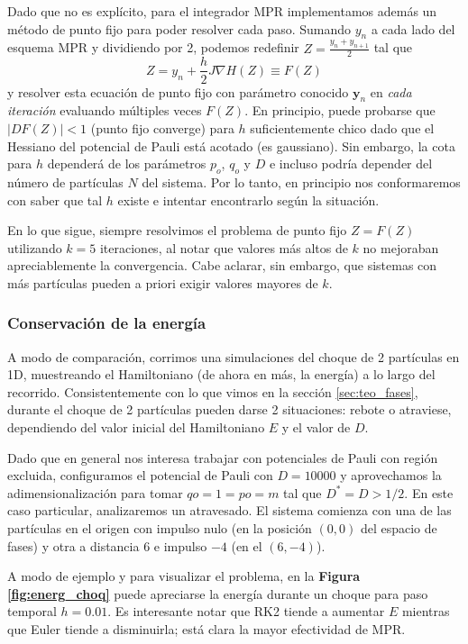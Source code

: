 Dado que no es explícito, para el integrador MPR implementamos además un método de punto fijo para poder resolver cada paso.
Sumando $y_n$ a cada lado del esquema MPR y dividiendo por 2, podemos redefinir $Z = \frac{y_n+y_{n+1}}{2}$ tal que
\[ Z = y_n + \frac{h}{2}J\nabla H(Z) \equiv F(Z) \]
y resolver esta ecuación de punto fijo con parámetro conocido $\mathbf{y}_n$ en \textit{cada iteración} evaluando múltiples veces $F(Z)$.
En principio, puede probarse que $|DF(Z)|<1$ (punto fijo converge) para $h$ suficientemente chico dado que el Hessiano del potencial de Pauli está acotado (es gaussiano).
Sin embargo, la cota para $h$ dependerá de los parámetros $p_o$, $q_o$ y $D$ e incluso podría depender del número de partículas $N$ del sistema.
Por lo tanto, en principio nos conformaremos con saber que tal $h$ existe e intentar encontrarlo según la situación.

En lo que sigue, siempre resolvimos el problema de punto fijo $Z = F(Z)$ utilizando $k=5$ iteraciones, al notar que valores más altos de $k$ no mejoraban apreciablemente la convergencia.
Cabe aclarar, sin embargo, que sistemas con más partículas pueden a priori exigir valores mayores de $k$.

\subsubsection{Conservación de la energía}

A modo de comparación, corrimos una simulaciones del choque de 2 partículas en 1D, muestreando el Hamiltoniano (de ahora en más, la energía) a lo largo del recorrido.
Consistentemente con lo que vimos en la sección \ref{sec:teo_fases}, durante el choque de 2 partículas pueden darse 2 situaciones: rebote o atraviese, dependiendo del valor inicial del Hamiltoniano $E$ y el valor de $D$.

Dado que en general nos interesa trabajar con potenciales de Pauli con región excluida, configuramos el potencial de Pauli con $D = 10000$ y aprovechamos la adimensionalización para tomar $qo = 1 = po = m$ tal que 
$D^*=D>1/2$.
En este caso particular, analizaremos un atravesado.
El sistema comienza con una de las partículas en el origen con impulso nulo (en la posición $(0, 0)$ del espacio de fases) y otra a distancia $6$ e impulso $-4$ (en el $(6, -4)$).

A modo de ejemplo y para visualizar el problema, en la \textbf{Figura \ref{fig:energ_choq}} puede apreciarse la energía durante un choque para paso temporal $h=0.01$.
Es interesante notar que RK2 tiende a aumentar $E$ mientras que Euler tiende a disminuirla; está clara la mayor efectividad de MPR.

